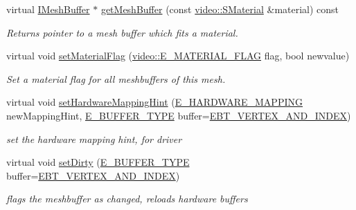 \begin{DoxyCompactItemize}
virtual \hyperlink{classirr_1_1scene_1_1IMeshBuffer}{I\+Mesh\+Buffer} $\ast$ \hyperlink{structirr_1_1scene_1_1SAnimatedMesh_a3c010c881f315e56a05f40632f3c7f79}{get\+Mesh\+Buffer} (const \hyperlink{classirr_1_1video_1_1SMaterial}{video\+::\+S\+Material} \&material) const
\begin{DoxyCompactList}\small\item\em Returns pointer to a mesh buffer which fits a material. \end{DoxyCompactList}\item 
\mbox{\label{structirr_1_1scene_1_1SAnimatedMesh_aefe38066b9c38c6d4ea522b5d988769e}} 
virtual void \hyperlink{structirr_1_1scene_1_1SAnimatedMesh_aefe38066b9c38c6d4ea522b5d988769e}{set\+Material\+Flag} (\hyperlink{namespaceirr_1_1video_a8a3bc00ae8137535b9fbc5f40add70d3}{video\+::\+E\+\_\+\+M\+A\+T\+E\+R\+I\+A\+L\+\_\+\+F\+L\+AG} flag, bool newvalue)
\begin{DoxyCompactList}\small\item\em Set a material flag for all meshbuffers of this mesh. \end{DoxyCompactList}\item 
\mbox{\label{structirr_1_1scene_1_1SAnimatedMesh_a69448fa91bd1c6316d11d9ae3b8b88e6}} 
virtual void \hyperlink{structirr_1_1scene_1_1SAnimatedMesh_a69448fa91bd1c6316d11d9ae3b8b88e6}{set\+Hardware\+Mapping\+Hint} (\hyperlink{namespaceirr_1_1scene_ac7d8ee8d77da75f2580bb9bb17231c27}{E\+\_\+\+H\+A\+R\+D\+W\+A\+R\+E\+\_\+\+M\+A\+P\+P\+I\+NG} new\+Mapping\+Hint, \hyperlink{namespaceirr_1_1scene_a8f59a89ffef0ad8e5b2c2cb874a93e8c}{E\+\_\+\+B\+U\+F\+F\+E\+R\+\_\+\+T\+Y\+PE} buffer=\hyperlink{namespaceirr_1_1scene_a8f59a89ffef0ad8e5b2c2cb874a93e8ca833624730c30cffccc121fe31aa0832c}{E\+B\+T\+\_\+\+V\+E\+R\+T\+E\+X\+\_\+\+A\+N\+D\+\_\+\+I\+N\+D\+EX})
\begin{DoxyCompactList}\small\item\em set the hardware mapping hint, for driver \end{DoxyCompactList}\item 
\mbox{\label{structirr_1_1scene_1_1SAnimatedMesh_a415b9404cee43f2f460ebb32724d7793}} 
virtual void \hyperlink{structirr_1_1scene_1_1SAnimatedMesh_a415b9404cee43f2f460ebb32724d7793}{set\+Dirty} (\hyperlink{namespaceirr_1_1scene_a8f59a89ffef0ad8e5b2c2cb874a93e8c}{E\+\_\+\+B\+U\+F\+F\+E\+R\+\_\+\+T\+Y\+PE} buffer=\hyperlink{namespaceirr_1_1scene_a8f59a89ffef0ad8e5b2c2cb874a93e8ca833624730c30cffccc121fe31aa0832c}{E\+B\+T\+\_\+\+V\+E\+R\+T\+E\+X\+\_\+\+A\+N\+D\+\_\+\+I\+N\+D\+EX})
\begin{DoxyCompactList}\small\item\em flags the meshbuffer as changed, reloads hardware buffers \end{DoxyCompactList}\end{DoxyCompactItemize}
